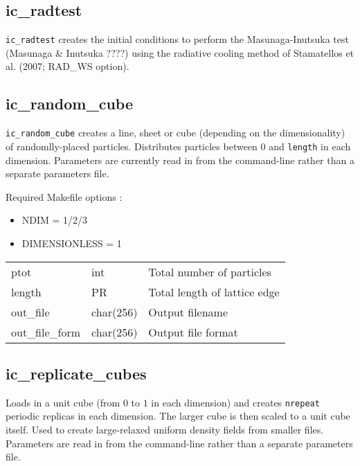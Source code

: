 \documentclass[a4paper]{article}
\newcommand{\var}[1]{\texttt{#1}}
\begin{document}
\subsection{ic\_radtest}
\var{ic\_radtest} creates the initial conditions to perform the Masunaga-Inutsuka test (Masunaga \& Inutsuka ????) using the radiative cooling method of Stamatellos et al. (2007; RAD\_WS option).

\newpage

\subsection{ic\_random\_cube}
\var{ic\_random\_cube} creates a line, sheet or cube (depending on the dimensionality) of randomlly-placed particles.  Distributes particles between $0$ and \var{length} in each dimension. Parameters are currently read in from the command-line rather than a separate parameters file. \newline

\noindent Required Makefile options :
\begin{itemize}
\item NDIM = 1/2/3
\item DIMENSIONLESS = 1
\end{itemize}

\vspace{0.1cm}

\begin{center}
\begin{supertabular}{|p{3cm}|p{2cm}|p{8cm}|}
ptot             & int       & Total number of particles \\
length           & PR        & Total length of lattice edge \\
out\_file        & char(256) & Output filename \\
out\_file\_form  & char(256) & Output file format \\
\end{supertabular}
\end{center}


\subsection{ic\_replicate\_cubes}
Loads in a unit cube (from $0$ to $1$ in each dimension) and creates \var{nrepeat} periodic replicas in each dimension.  The larger cube is then scaled to a unit cube itself.  Used to create large-relaxed uniform density fields from smaller files.  Parameters are read in from the command-line rather than a separate parameters file. \newline
\end{document}

